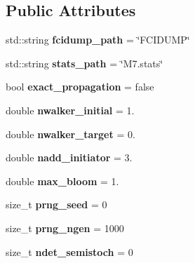 \subsection*{Public Attributes}
\begin{DoxyCompactItemize}
\item 
std\+::string {\bfseries fcidump\+\_\+path} = \char`\"{}F\+C\+I\+D\+U\+MP\char`\"{}\hypertarget{structOptions_afa1bff5853b97b7ec81a2f0815dc4856}{}\label{structOptions_afa1bff5853b97b7ec81a2f0815dc4856}

\item 
std\+::string {\bfseries stats\+\_\+path} = \char`\"{}M7.\+stats\char`\"{}\hypertarget{structOptions_abadd507392985a56e7a48544b6a2411b}{}\label{structOptions_abadd507392985a56e7a48544b6a2411b}

\item 
bool {\bfseries exact\+\_\+propagation} = false\hypertarget{structOptions_a975dd320ffe5f8eea705772c4ca5ef2b}{}\label{structOptions_a975dd320ffe5f8eea705772c4ca5ef2b}

\item 
double {\bfseries nwalker\+\_\+initial} = 1.\hypertarget{structOptions_adb6ffd1b423858619a373b9e65179bd0}{}\label{structOptions_adb6ffd1b423858619a373b9e65179bd0}

\item 
double {\bfseries nwalker\+\_\+target} = 0.\hypertarget{structOptions_ab838044b506baedd2d27e260647eb0f5}{}\label{structOptions_ab838044b506baedd2d27e260647eb0f5}

\item 
double {\bfseries nadd\+\_\+initiator} = 3.\hypertarget{structOptions_a8008a5b88419a2b645c84372fe17104e}{}\label{structOptions_a8008a5b88419a2b645c84372fe17104e}

\item 
double {\bfseries max\+\_\+bloom} = 1.\hypertarget{structOptions_ad6af58a5edb36508dee4564ad1a13523}{}\label{structOptions_ad6af58a5edb36508dee4564ad1a13523}

\item 
size\+\_\+t {\bfseries prng\+\_\+seed} = 0\hypertarget{structOptions_aceb575e554b8cf30dbcff1d132f8c52b}{}\label{structOptions_aceb575e554b8cf30dbcff1d132f8c52b}

\item 
size\+\_\+t {\bfseries prng\+\_\+ngen} = 1000\hypertarget{structOptions_ad7eb8025af9bd5bc7b4cb61af20a4afb}{}\label{structOptions_ad7eb8025af9bd5bc7b4cb61af20a4afb}

\item 
size\+\_\+t {\bfseries ndet\+\_\+semistoch} = 0\hypertarget{structOptions_a5e56c66bb88a854ec0ddd0ff8d7c634d}{}\label{structOptions_a5e56c66bb88a854ec0ddd0ff8d7c634d}


\end{DoxyCompactItemize}

